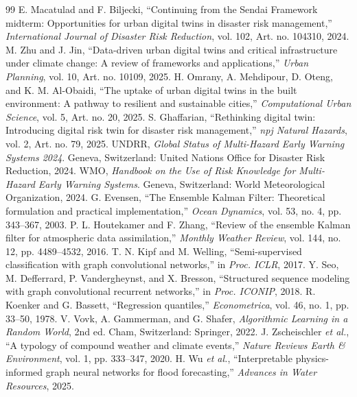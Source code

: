 \documentclass[journal]{IEEEtran}
\begin{document}
\balance
\begin{thebibliography}{99}
 E. Macatulad and F. Biljecki, ``Continuing from the Sendai Framework midterm: Opportunities for urban digital twins in disaster risk management,'' \emph{International Journal of Disaster Risk Reduction}, vol. 102, Art. no. 104310, 2024.
 M. Zhu and J. Jin, ``Data-driven urban digital twins and critical infrastructure under climate change: A review of frameworks and applications,'' \emph{Urban Planning}, vol. 10, Art. no. 10109, 2025.
 H. Omrany, A. Mehdipour, D. Oteng, and K. M. Al-Obaidi, ``The uptake of urban digital twins in the built environment: A pathway to resilient and sustainable cities,'' \emph{Computational Urban Science}, vol. 5, Art. no. 20, 2025.
 S. Ghaffarian, ``Rethinking digital twin: Introducing digital risk twin for disaster risk management,'' \emph{npj Natural Hazards}, vol. 2, Art. no. 79, 2025.
 UNDRR, \emph{Global Status of Multi-Hazard Early Warning Systems 2024}. Geneva, Switzerland: United Nations Office for Disaster Risk Reduction, 2024.
 WMO, \emph{Handbook on the Use of Risk Knowledge for Multi-Hazard Early Warning Systems}. Geneva, Switzerland: World Meteorological Organization, 2024.
 G. Evensen, ``The Ensemble Kalman Filter: Theoretical formulation and practical implementation,'' \emph{Ocean Dynamics}, vol. 53, no. 4, pp. 343--367, 2003.
 P. L. Houtekamer and F. Zhang, ``Review of the ensemble Kalman filter for atmospheric data assimilation,'' \emph{Monthly Weather Review}, vol. 144, no. 12, pp. 4489--4532, 2016.
 T. N. Kipf and M. Welling, ``Semi-supervised classification with graph convolutional networks,'' in \emph{Proc. ICLR}, 2017.
 Y. Seo, M. Defferrard, P. Vandergheynst, and X. Bresson, ``Structured sequence modeling with graph convolutional recurrent networks,'' in \emph{Proc. ICONIP}, 2018.
 R. Koenker and G. Bassett, ``Regression quantiles,'' \emph{Econometrica}, vol. 46, no. 1, pp. 33--50, 1978.
 V. Vovk, A. Gammerman, and G. Shafer, \emph{Algorithmic Learning in a Random World}, 2nd ed. Cham, Switzerland: Springer, 2022.
 J. Zscheischler \emph{et al.}, ``A typology of compound weather and climate events,'' \emph{Nature Reviews Earth \& Environment}, vol. 1, pp. 333--347, 2020.
 H. Wu \emph{et al.}, ``Interpretable physics-informed graph neural networks for flood forecasting,'' \emph{Advances in Water Resources}, 2025.
\end{thebibliography}
\end{document}
